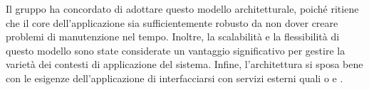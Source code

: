 \vspace{0.5\baselineskip}
\par Il gruppo ha concordato di adottare questo modello architetturale, poiché ritiene che il core dell'applicazione sia sufficientemente robusto da non dover creare problemi di manutenzione nel tempo. Inoltre, la scalabilità e la flessibilità di questo modello sono state considerate un vantaggio significativo per gestire la varietà dei contesti di applicazione del sistema. Infine, l'architettura si sposa bene con le esigenze dell'applicazione di interfacciarsi con servizi esterni quali  o  e .
